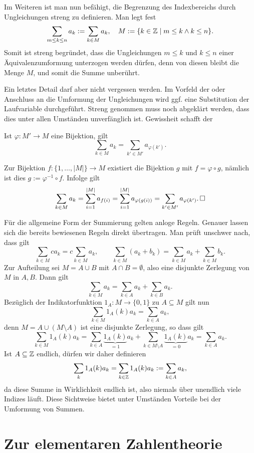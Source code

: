 \noindent
Im Weiteren ist man nun befähigt, die Begrenzung des Indexbereichs
durch Ungleichungen streng zu definieren. Man legt fest
\[\sum_{m\le k\le n} a_k := \sum_{k\in M} a_k,
\quad M := \{k\in\mathbb Z\mid m\le k\land k\le n\}.\]
Somit ist streng begründet, dass die Ungleichungen $m\le k$
und $k\le n$ einer Äquivalenzumformung unterzogen werden dürfen,
denn von diesen bleibt die Menge $M$, und somit die Summe unberührt.

Ein letztes Detail darf aber nicht vergessen werden. Im Vorfeld der
oder Anschluss an die Umformung der Ungleichungen wird ggf. eine
Substitution der Laufvariable durchgeführt. Streng genommen muss noch
abgeklärt werden, dass dies unter allen Umständen unverfänglich ist.
Gewissheit schafft der

\begin{Satz}[Substitutionsregel]
Ist $\varphi\colon M'\to M$ eine Bijektion, gilt
\[\sum_{k\in M} a_k = \sum_{k'\in M'} a_{\varphi(k')}.\]
\end{Satz}
\begin{Beweis}
Zur Bijektion $f\colon\{1,\ldots,|M|\}\to M$ existiert die Bijektion
$g$ mit $f = \varphi\circ g$, nämlich ist dies $g:=\varphi^{-1}\circ f$.
Infolge gilt
\[\sum_{k\in M} a_k = \sum_{i=1}^{|M|} a_{f(i)}
= \sum_{i=1}^{|M|} a_{\varphi(g(i))}
= \sum_{k'\in M'} a_{\varphi(k')}.\,\Box\]
\end{Beweis}
Für die allgemeine Form der Summierung gelten anloge Regeln. Genauer
lassen sich die bereits bewiesenen Regeln direkt übertragen.
Man prüft unschwer nach, dass gilt
\[\sum_{k\in M} ca_k = c\sum_{k\in M}a_k,\qquad\sum_{k\in M} (a_k+b_k)
= \sum_{k\in M} a_k + \sum_{k\in M} b_k.\]
Zur Aufteilung sei $M = A\cup B$ mit $A\cap B = \emptyset$, also
eine disjunkte Zerlegung von $M$ in $A,B$. Dann gilt
\[\sum_{k\in M} a_k = \sum_{k\in A} a_k + \sum_{k\in B} a_k.\]
Bezüglich der Indikatorfunktion $1_A\colon M\to\{0,1\}$
zu $A\subseteq M$ gilt nun
\[\sum_{k\in M} 1_A(k)a_k = \sum_{k\in A} a_k,\]
denn $M=A\cup (M\setminus A)$ ist eine disjunkte Zerlegung, so dass gilt
\[\sum_{k\in M} 1_A(k)a_k = \sum_{k\in A} \underbrace{1_A(k)}_{=1}a_k
+ \sum_{k\in M\setminus A} \underbrace{1_A(k)}_{=0}a_k
= \sum_{k\in A} a_k.\]
Ist $A\subseteq\mathbb Z$ endlich, dürfen wir daher definieren
\[\sum_k 1_A(k)a_k = \sum_{k\in\mathbb Z} 1_A(k)a_k := \sum_{k\in A} a_k,\]
da diese Summe in Wirklichkeit endlich ist, also niemals über
unendlich viele Indizes läuft. Diese Sichtweise bietet unter Umständen
Vorteile bei der Umformung von Summen.

\section{Zur elementaren Zahlentheorie}

